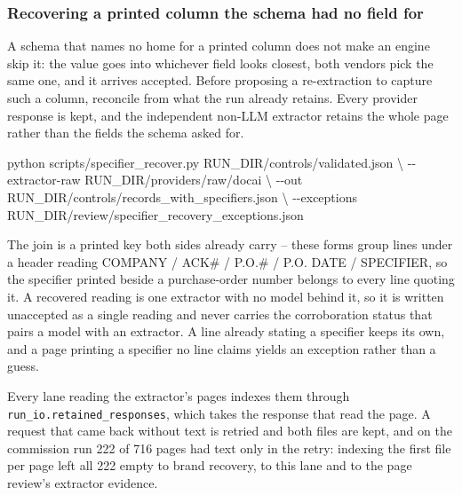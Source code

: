 \documentclass[
]{article}
\newenvironment{Shaded}{}{}
\newcommand{\AttributeTok}[1]{\textcolor[rgb]{0.49,0.56,0.16}{#1}}
\newcommand{\DataTypeTok}[1]{\textcolor[rgb]{0.56,0.13,0.00}{#1}}
\newcommand{\ExtensionTok}[1]{#1}
\newcommand{\NormalTok}[1]{#1}
\begin{document}
\subsubsection{Recovering a printed column the schema had no field
for}\label{recovering-a-printed-column-the-schema-had-no-field-for}

A schema that names no home for a printed column does not make an engine
skip it: the value goes into whichever field looks closest, both vendors
pick the same one, and it arrives accepted. Before proposing a
re-extraction to capture such a column, reconcile from what the run
already retains. Every provider response is kept, and the independent
non-LLM extractor retains the whole page rather than the fields the
schema asked for.

\begin{Shaded}
\begin{Highlighting}[]
\ExtensionTok{python}\NormalTok{ scripts/specifier\_recover.py RUN\_DIR/controls/validated.json }\DataTypeTok{\textbackslash{}}
  \AttributeTok{{-}{-}extractor{-}raw}\NormalTok{ RUN\_DIR/providers/raw/docai }\DataTypeTok{\textbackslash{}}
  \AttributeTok{{-}{-}out}\NormalTok{ RUN\_DIR/controls/records\_with\_specifiers.json }\DataTypeTok{\textbackslash{}}
  \AttributeTok{{-}{-}exceptions}\NormalTok{ RUN\_DIR/review/specifier\_recovery\_exceptions.json}
\end{Highlighting}
\end{Shaded}

The join is a printed key both sides already carry -- these forms group
lines under a header reading COMPANY / ACK\# / P.O.\# / P.O. DATE /
SPECIFIER, so the specifier printed beside a purchase-order number
belongs to every line quoting it. A recovered reading is one extractor
with no model behind it, so it is written unaccepted as a single reading
and never carries the corroboration status that pairs a model with an
extractor. A line already stating a specifier keeps its own, and a page
printing a specifier no line claims yields an exception rather than a
guess.

Every lane reading the extractor's pages indexes them through
\texttt{run\_\allowbreak{}io.retained\_\allowbreak{}responses}, which
takes the response that read the page. A request that came back without
text is retried and both files are kept, and on the commission run 222
of 716 pages had text only in the retry: indexing the first file per
page left all 222 empty to brand recovery, to this lane and to the page
review's extractor evidence.
\end{document}
